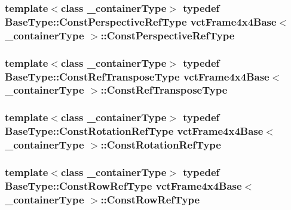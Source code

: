 \hypertarget{classvct_frame4x4_base_a47161d0a7598341722759640af9413e5}{
\subsubsection[{Const\-Perspective\-Ref\-Type}]{\setlength{\rightskip}{0pt plus 5cm}template$<$class \-\_\-container\-Type$>$ typedef Base\-Type\-::\-Const\-Perspective\-Ref\-Type {\bf vct\-Frame4x4\-Base}$<$ \-\_\-container\-Type $>$\-::{\bf Const\-Perspective\-Ref\-Type}}}\label{classvct_frame4x4_base_a47161d0a7598341722759640af9413e5}
\hypertarget{classvct_frame4x4_base_a1f3226ad5b15ec1edb95cfe760eacc4f}{
\subsubsection[{Const\-Ref\-Transpose\-Type}]{\setlength{\rightskip}{0pt plus 5cm}template$<$class \-\_\-container\-Type$>$ typedef {\bf Base\-Type\-::\-Const\-Ref\-Transpose\-Type} {\bf vct\-Frame4x4\-Base}$<$ \-\_\-container\-Type $>$\-::{\bf Const\-Ref\-Transpose\-Type}}}\label{classvct_frame4x4_base_a1f3226ad5b15ec1edb95cfe760eacc4f}
\hypertarget{classvct_frame4x4_base_a427cd6a2c5f48f68fde733a9b51a83e3}{
\subsubsection[{Const\-Rotation\-Ref\-Type}]{\setlength{\rightskip}{0pt plus 5cm}template$<$class \-\_\-container\-Type$>$ typedef Base\-Type\-::\-Const\-Rotation\-Ref\-Type {\bf vct\-Frame4x4\-Base}$<$ \-\_\-container\-Type $>$\-::{\bf Const\-Rotation\-Ref\-Type}}}\label{classvct_frame4x4_base_a427cd6a2c5f48f68fde733a9b51a83e3}
\hypertarget{classvct_frame4x4_base_a75f2ff66cb8cdd2322c576e7be0b94a1}{
\subsubsection[{Const\-Row\-Ref\-Type}]{\setlength{\rightskip}{0pt plus 5cm}template$<$class \-\_\-container\-Type$>$ typedef {\bf Base\-Type\-::\-Const\-Row\-Ref\-Type} {\bf vct\-Frame4x4\-Base}$<$ \-\_\-container\-Type $>$\-::{\bf Const\-Row\-Ref\-Type}}}\label{classvct_frame4x4_base_a75f2ff66cb8cdd2322c576e7be0b94a1}
